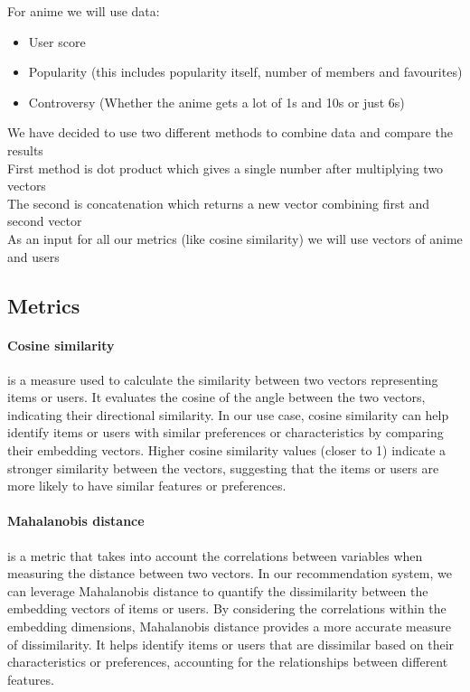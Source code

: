 \documentclass[12pt]{article}
\begin{document}
For anime we will use data: 
\begin{itemize}
    \item User score 
    \item Popularity (this includes popularity itself, number of members and favourites)
    \item Controversy (Whether the anime gets a lot of 1s and 10s or just 6s)
\end{itemize}

We have decided to use two different methods to combine data and compare the results \\ 
First method is dot product which gives a single number after multiplying two vectors \\ 
The second is concatenation which returns a new vector combining first and second vector \\ 
As an input for all our metrics (like cosine similarity) we will use vectors of anime and users


\subsection{Metrics}
\paragraph{Cosine similarity} is a measure used to calculate the similarity between two vectors representing items or users. It evaluates the cosine of the angle between the two vectors, indicating their directional similarity. In our use case, cosine similarity can help identify items or users with similar preferences or characteristics by comparing their embedding vectors. Higher cosine similarity values (closer to 1) indicate a stronger similarity between the vectors, suggesting that the items or users are more likely to have similar features or preferences.
\paragraph{Mahalanobis distance} is a metric that takes into account the correlations between variables when measuring the distance between two vectors. In our recommendation system, we can leverage Mahalanobis distance to quantify the dissimilarity between the embedding vectors of items or users. By considering the correlations within the embedding dimensions, Mahalanobis distance provides a more accurate measure of dissimilarity. It helps identify items or users that are dissimilar based on their characteristics or preferences, accounting for the relationships between different features.
\end{document}
